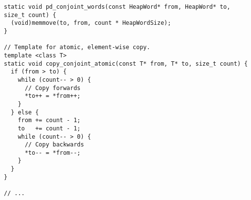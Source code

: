 \begin{itemize}
\begin{verbatim}
static void pd_conjoint_words(const HeapWord* from, HeapWord* to, size_t count) {
  (void)memmove(to, from, count * HeapWordSize);
}

// Template for atomic, element-wise copy.
template <class T>
static void copy_conjoint_atomic(const T* from, T* to, size_t count) {
  if (from > to) {
    while (count-- > 0) {
      // Copy forwards
      *to++ = *from++;
    }
  } else {
    from += count - 1;
    to   += count - 1;
    while (count-- > 0) {
      // Copy backwards
      *to-- = *from--;
    }
  }
}

// ...
\end{verbatim}

\end{itemize}